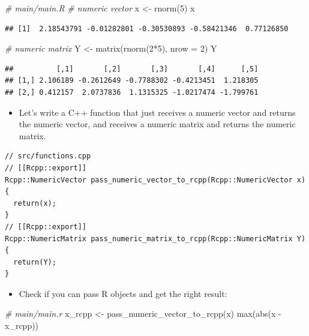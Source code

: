 \documentclass[
]{book}
\newenvironment{Shaded}{\begin{snugshade}}{\end{snugshade}}
\newcommand{\AttributeTok}[1]{\textcolor[rgb]{0.77,0.63,0.00}{#1}}
\newcommand{\CommentTok}[1]{\textcolor[rgb]{0.56,0.35,0.01}{\textit{#1}}}
\newcommand{\DecValTok}[1]{\textcolor[rgb]{0.00,0.00,0.81}{#1}}
\newcommand{\FunctionTok}[1]{\textcolor[rgb]{0.00,0.00,0.00}{#1}}
\newcommand{\NormalTok}[1]{#1}
\newcommand{\OtherTok}[1]{\textcolor[rgb]{0.56,0.35,0.01}{#1}}
\newcommand{\SpecialCharTok}[1]{\textcolor[rgb]{0.00,0.00,0.00}{#1}}
\providecommand{\tightlist}{%
  \setlength{\itemsep}{0pt}\setlength{\parskip}{0pt}}
\begin{document}
\begin{Shaded}
\begin{Highlighting}[]
\CommentTok{\# main/main.R}
\CommentTok{\# numeric vector }
\NormalTok{x }\OtherTok{\textless{}{-}} \FunctionTok{rnorm}\NormalTok{(}\DecValTok{5}\NormalTok{)}
\NormalTok{x}
\end{Highlighting}
\end{Shaded}

\begin{verbatim}
## [1]  2.18543791 -0.01282801 -0.30530893 -0.58421346  0.77126850
\end{verbatim}

\begin{Shaded}
\begin{Highlighting}[]
\CommentTok{\# numeric matrix}
\NormalTok{Y }\OtherTok{\textless{}{-}} \FunctionTok{matrix}\NormalTok{(}\FunctionTok{rnorm}\NormalTok{(}\DecValTok{2}\SpecialCharTok{*}\DecValTok{5}\NormalTok{), }\AttributeTok{nrow =} \DecValTok{2}\NormalTok{)}
\NormalTok{Y}
\end{Highlighting}
\end{Shaded}

\begin{verbatim}
##          [,1]       [,2]       [,3]       [,4]      [,5]
## [1,] 2.106189 -0.2612649 -0.7788302 -0.4213451  1.218305
## [2,] 0.412157  2.0737836  1.1315325 -1.0217474 -1.799761
\end{verbatim}

\begin{itemize}
\tightlist
\item
  Let's write a C++ function that just receives a numeric vector and returns the numeric vector, and receives a numeric matrix and returns the numeric matrix.
\end{itemize}

\begin{verbatim}
// src/functions.cpp
// [[Rcpp::export]]
Rcpp::NumericVector pass_numeric_vector_to_rcpp(Rcpp::NumericVector x) {
  return(x);
}
// [[Rcpp::export]]
Rcpp::NumericMatrix pass_numeric_matrix_to_rcpp(Rcpp::NumericMatrix Y) {
  return(Y);
}
\end{verbatim}

\begin{itemize}
\tightlist
\item
  Check if you can pass R objects and get the right result:
\end{itemize}

\begin{Shaded}
\begin{Highlighting}[]
\CommentTok{\# main/main.r}
\NormalTok{x\_rcpp }\OtherTok{\textless{}{-}} \FunctionTok{pass\_numeric\_vector\_to\_rcpp}\NormalTok{(x)}
\FunctionTok{max}\NormalTok{(}\FunctionTok{abs}\NormalTok{(x }\SpecialCharTok{{-}}\NormalTok{ x\_rcpp))}
\end{Highlighting}
\end{Shaded}
\end{document}
